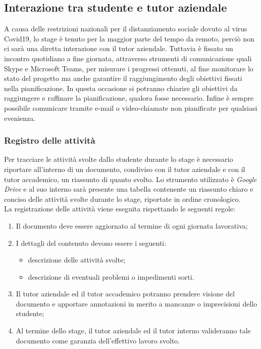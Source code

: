 \subsection{Interazione tra studente e tutor aziendale}

A causa delle restrizioni nazionali per il distanziamento sociale dovuto al virus Covid19, lo stage è tenuto per la maggior parte del tempo da remoto, perciò non ci sarà una diretta interazione con il tutor aziendale. Tuttavia è fissato un incontro quotidiano a fine giornata, attraverso strumenti di comunicazione quali Skype e Microsoft Teams, per misurare i progressi ottenuti, al fine monitorare lo stato del progetto ma anche garantire il raggiungimento degli obiettivi fissati nella pianificazione. In questa occasione si potranno chiarire gli obiettivi da raggiungere e raffinare la pianificazione, qualora fosse necessario.
Infine è sempre possibile comunicare tramite e-mail o video-chiamate non pianificate per qualsiasi evenienza.

\subsubsection{Registro delle attività}
Per tracciare le attività svolte dallo studente durante lo stage è necessario riportare all'interno di un documento, condiviso con il tutor aziendale e con il tutor accademico, un riassunto di quanto svolto.
Lo strumento utilizzato è \textit{Google Drive} e al suo interno sarà presente una tabella contenente un riassunto chiaro e conciso delle attività svolte durante lo stage, riportate in ordine cronologico. \\
La registrazione delle attività viene eseguita rispettando le seguenti regole:
\begin{enumerate}
	\item Il documento deve essere aggiornato al termine di ogni giornata lavorativa;
	\item I dettagli del contenuto devono essere i seguenti:
		\begin{itemize}
			\item descrizione delle attività svolte;
			\item descrizione di eventuali problemi o impedimenti sorti.
		\end{itemize}
	\item Il tutor aziendale ed il tutor accademico potranno prendere visione del documento e apportare annotazioni in merito a mancanze o imprecisioni dello studente;
	\item Al termine dello stage, il tutor aziendale ed il tutor interno valideranno tale documento come garanzia dell'effettivo lavoro svolto.
\end{enumerate}